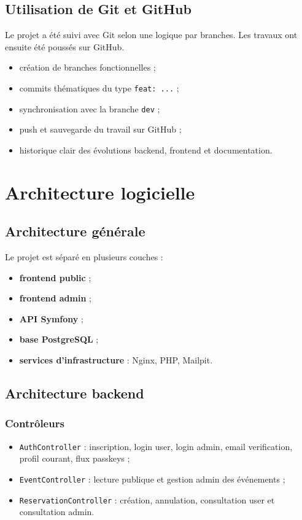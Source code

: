 \documentclass[12pt,a4paper]{report}
\begin{document}
\section{Utilisation de Git et GitHub}

Le projet a été suivi avec Git selon une logique par branches. Les travaux ont ensuite été poussés sur GitHub.

\begin{itemize}[leftmargin=1.2cm]
    \item création de branches fonctionnelles ;
    \item commits thématiques du type \texttt{feat: ...} ;
    \item synchronisation avec la branche \texttt{dev} ;
    \item push et sauvegarde du travail sur GitHub ;
    \item historique clair des évolutions backend, frontend et documentation.
\end{itemize}

\chapter{Architecture logicielle}

\section{Architecture générale}

Le projet est séparé en plusieurs couches :
\begin{itemize}[leftmargin=1.2cm]
    \item \textbf{frontend public} ;
    \item \textbf{frontend admin} ;
    \item \textbf{API Symfony} ;
    \item \textbf{base PostgreSQL} ;
    \item \textbf{services d'infrastructure} : Nginx, PHP, Mailpit.
\end{itemize}

\section{Architecture backend}

\subsection{Contrôleurs}
\begin{itemize}[leftmargin=1.2cm]
    \item \texttt{AuthController} : inscription, login user, login admin, email verification, profil courant, flux passkeys ;
    \item \texttt{EventController} : lecture publique et gestion admin des événements ;
    \item \texttt{ReservationController} : création, annulation, consultation user et consultation admin.
\end{itemize}
\end{document}
